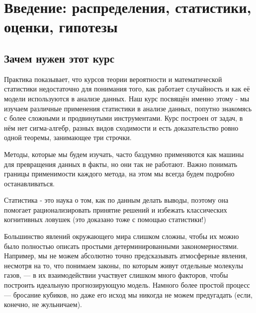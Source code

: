\chapter{Введение: распределения, статистики, оценки, гипотезы}

\section{Зачем нужен этот курс}
Практика показывает, что курсов теории вероятности и математической статистики недостаточно для понимания того, как работает случайность и как её модели используются в анализе данных. Наш курс посвящён именно этому - мы изучаем различные применения статистики в анализе данных, попутно знакомясь с более сложными и продвинутыми инструментами. Курс построен от задач, в нём нет сигма-алгебр, разных видов сходимости и есть доказательство ровно одной теоремы, занимающее три строчки.

Методы, которые мы будем изучать, часто баздумно применяются как машины для превращения данных в факты, но они так не работают. Важно понимать границы применимости каждого метода, на этом мы всегда будем подробно останавливаться.

\begin{definition}
Статистика - это наука о том, как по данным делать выводы, поэтому она помогает рационализировать принятие решений и избежать классических когнитивных ловушек (это доказано тоже с помощью статистики!)
\end{definition}

Большинство явлений окружающего мира слишком сложны, чтобы их можно было полностью описать простыми детерминированными закономерностями. Например, мы не можем абсолютно точно предсказывать атмосферные явления, несмотря на то, что понимаем законы, по которым живут отдельные молекулы газов, — в их взаимодействии участвует слишком много факторов, чтобы построить идеальную прогнозирующую модель. Намного более простой процесс — бросание кубиков, но даже его исход мы никогда не можем предугадать (если, конечно, не жульничаем). 

